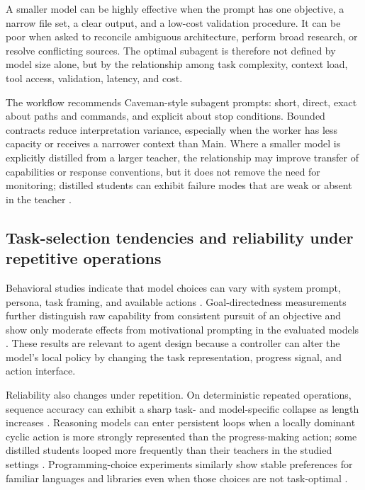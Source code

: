 \documentclass[11pt,a4paper]{article}
\begin{document}
A smaller model can be highly effective when the prompt has one objective, a narrow file set, a clear output, and a low-cost validation procedure. It can be poor when asked to reconcile ambiguous architecture, perform broad research, or resolve conflicting sources. The optimal subagent is therefore not defined by model size alone, but by the relationship among task complexity, context load, tool access, validation, latency, and cost.

The workflow recommends Caveman-style subagent prompts: short, direct, exact about paths and commands, and explicit about stop conditions. Bounded contracts reduce interpretation variance, especially when the worker has less capacity or receives a narrower context than Main. Where a smaller model is explicitly distilled from a larger teacher, the relationship may improve transfer of capabilities or response conventions, but it does not remove the need for monitoring; distilled students can exhibit failure modes that are weak or absent in the teacher \cite{pipis2025}.

\subsection{Task-selection tendencies and reliability under repetitive operations}\label{sec:repetitive-operations}

Behavioral studies indicate that model choices can vary with system prompt, persona, task framing, and available actions \cite{gilg2026,tagliabue2025}. Goal-directedness measurements further distinguish raw capability from consistent pursuit of an objective and show only moderate effects from motivational prompting in the evaluated models \cite{everitt2025goals}. These results are relevant to agent design because a controller can alter the model's local policy by changing the task representation, progress signal, and action interface.

Reliability also changes under repetition. On deterministic repeated operations, sequence accuracy can exhibit a sharp task- and model-specific collapse as length increases \cite{hou2025focus}. Reasoning models can enter persistent loops when a locally dominant cyclic action is more strongly represented than the progress-making action; some distilled students looped more frequently than their teachers in the studied settings \cite{pipis2025}. Programming-choice experiments similarly show stable preferences for familiar languages and libraries even when those choices are not task-optimal \cite{twist2026}.
\end{document}
